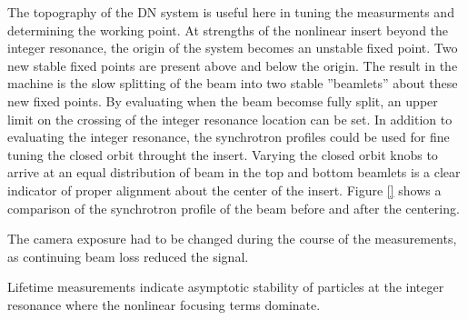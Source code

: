 The topography of the DN system is useful here in tuning the measurments and determining the working point. At strengths of the nonlinear insert beyond the integer resonance, the origin of the system becomes an unstable fixed point. Two new stable fixed points are present above and below the origin. The result in the machine is the slow splitting of the beam into two stable ”beamlets” about these new fixed points. By evaluating when the beam becomse fully split, an upper limit on the crossing of the integer resonance location can be set. In addition to evaluating the integer resonance, the synchrotron profiles could be used for fine tuning the closed orbit throught the insert. Varying the closed orbit knobs to arrive at an equal distribution of beam in the top and bottom beamlets is a  clear indicator of proper alignment about the center of the insert. Figure \ref{} shows a comparison of the synchrotron profile of the beam before and after the centering.

The camera exposure had to be changed during the course of the measurements, as continuing beam loss reduced the signal.

Lifetime measurements indicate asymptotic stability of particles at the integer resonance where the nonlinear focusing terms dominate.
